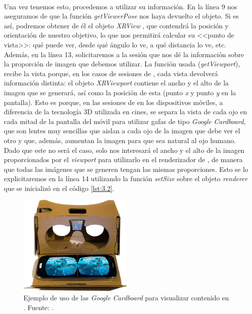\documentclass{subfiles}
\begin{document}
        \paragraph{}
        Una vez tenemos esto, procedemos a utilizar su información. En la línea 9 nos aseguramos de que la función \textit{getViewerPose} nos haya devuelto el objeto. Si es así, podremos obtener de él el objeto \textit{XRView} \cite{web:mozilla_xrview}, que contendrá la posición y orientación de nuestro objetivo, lo que nos permitirá calcular su <<punto de vista>>: qué puede ver, desde qué ángulo lo ve, a qué distancia lo ve, etc. Además, en la línea 13, solicitaremos a la sesión que nos dé la información sobre la proporción de imagen que debemos utilizar. La función usada (\textit{getViewport}), recibe la vista porque, en los casos de sesiones de \rv, cada vista devolverá información distinta: el objeto \textit{XRViewport} contiene el ancho y el alto de la imagen que se generará, así como la posición de esta (punto \textit{x} y punto \textit{y} en la pantalla). Esto es porque, en las sesiones de \ra en los dispositivos móviles, a diferencia de la tecnología 3D utilizada en cines, se separa la vista de cada ojo en cada mitad de la pantalla del móvil para utilizar gafas de tipo \textit{Google Cardboard}, que son lentes muy sencillas que aislan a cada ojo de la imagen que debe ver el otro y que, además, aumentan la imagen para que sea natural al ojo humano. Dado que este no será el caso, solo nos interesará el ancho y el alto de la imagen proporcionados por el \textit{viewport} para utilizarlo en el renderizador de \threejs, de manera que todas las imágenes que se generen tengan las mismas proporciones. Esto se lo explicitaremos en la línea 14 utilizando la función \textit{setSize} sobre el objeto \textit{renderer} que se inicializó en el código \ref{lst:3.2}.

\begin{figure}
\centering
\includegraphics[width=0.5\textwidth]{img/google_cardboard.jpg}
\caption[Ejemplo de uso de las \textit{Google Cardboard} para visualizar contenido en \rv.]{Ejemplo de uso de las \textit{Google Cardboard} para visualizar contenido en \rv. Fuente: .}
\label{fig:google_cardboard}
\end{figure}
\end{document}
